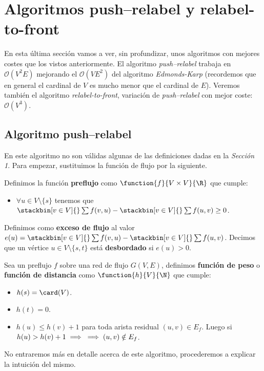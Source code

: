 \section{Algoritmos push–relabel y  relabel-to-front}
En esta última sección vamos a ver, sin profundizar, unos algoritmos con mejores costes que los vistos anteriormente.
El algoritmo \textit{push–relabel} trabaja en $\mathcal{O}(V^2E)$ mejorando el $\mathcal{O}(VE^2)$ del algoritmo \textit{Edmonds-Karp} (recordemos que en general el cardinal de $V$ es mucho menor que el cardinal de $E$). Veremos también el algoritmo \textit{relabel-to-front}, variación de \textit{push–relabel} con mejor coste: $\mathcal{O}(V^3)$.
\subsection{Algoritmo push–relabel}
En este algoritmo no son válidas algunas de las definiciones dadas en la \textit{Sección 1}. Para empezar, sustituimos la función de flujo por la siguiente.

\begin{defi} Definimos la función \textbf{preflujo} como $\function{f}{V\times V}{\R}$ que cumple:
\begin{itemize}
\item $\forall u\in V\setminus\{s\}$ tenemos que $\stackbin[v\in V]{}\sum f(v,u)-\stackbin[v\in V]{}\sum f(u,v) \geq 0$.
\end{itemize}

Definimos como \textbf{exceso de flujo} al valor $e(u)=\stackbin[v\in V]{}\sum f(v,u)-\stackbin[v\in V]{}\sum f(u,v)$. Decimos que un vértice $u\in V\setminus\{s,t\}$ está \textbf{desbordado} si $e(u)>0$.
\end{defi}

\begin{defi} Sea un preflujo $f$ sobre una red de flujo $G(V,E)$, definimos \textbf{función de peso} o \textbf{función de distancia} como $\function{h}{V}{\N}$ que cumple:
\begin{itemize}
\item $h(s) = \card(V)$.
\item $h(t) = 0$.
\item $h(u)\leq h(v) + 1$ para toda arista residual $(u,v)\in E_f$. Luego si $h(u) > h(v) +1\implies\\\implies (u,v)\notin E_f$.
\end{itemize}
\end{defi}

No entraremos más en detalle acerca de este algoritmo, procederemos a explicar la intuición del mismo.

